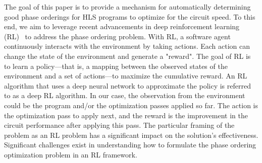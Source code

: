 The goal of this paper is to provide a mechanism for automatically determining good phase orderings for HLS programs to optimize for the circuit speed. To this end, we aim to leverage recent advancements in deep reinforcement learning (RL)~\cite{sutton1998,hajali2019deep} to address the phase ordering problem. 
With RL, a software agent continuously interacts with the environment by taking actions. Each action can change the state of the environment and generate a "reward". The goal of RL is to learn a policy---that is, a mapping between the observed states of the environment and a set of actions---to maximize the cumulative reward. An RL algorithm that uses a deep neural network to approximate the policy is referred to as a deep RL algorithm. In our case, the observation from the environment could be the program and/or the optimization passes applied so far. The action is the optimization pass to apply next, and the reward is the improvement in the circuit performance after applying this pass. 
The particular framing of the problem as an RL problem has a significant impact on the solution's effectiveness. Significant challenges exist in understanding how to formulate the phase ordering optimization problem in an RL framework. 

